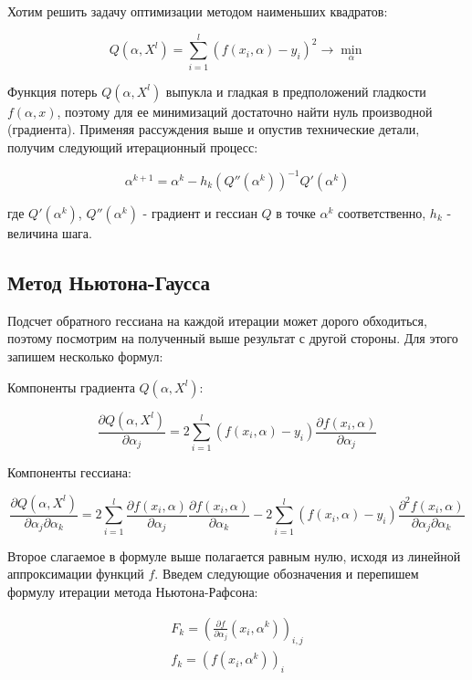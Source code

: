 {Хотим решить задачу оптимизации методом наименьших квадратов:

\[
Q(\alpha, X^{l}) = \sum\limits_{i = 1}^{l}\left(f(x_{i}, \alpha) - y_{i} \right)^{2} \to \min_{\alpha}
\]

Функция потерь \( Q(\alpha, X^{l}) \) выпукла и гладкая в предположений гладкости \( f(\alpha, x) \), поэтому для ее минимизаций достаточно найти нуль производной (градиента). Применяя рассуждения выше и опустив технические детали, получим следующий итерационный процесс:

\[
\alpha^{k + 1} = \alpha^{k} - h_{k}\left(Q''( \alpha^{k} )\right)^{-1} Q'(\alpha^{k})
\]

где \( Q'( \alpha^{k} ) \), \( Q''(\alpha^{k} ) \) - градиент и гессиан \( Q \) в точке \( \alpha^{k} \) соответственно, \( h_{k} \) - величина шага.
\subsection*{Метод Ньютона-Гаусса}

Подсчет обратного гессиана на каждой итерации может дорого обходиться, поэтому посмотрим на полученный выше результат с другой стороны. Для этого запишем несколько формул:

Компоненты градиента \( Q(\alpha, X^{l}) \):

\[
\frac{\partial Q(\alpha, X^{l})}{\partial\alpha_{j}} = 2 \sum\limits_{i = 1}^{l} \left(f(x_{i}, \alpha) - y_{i} \right)\frac{\partial f(x_{i}, \alpha)}{\partial\alpha_{j}}
\]

Компоненты гессиана:

\[
\frac{\partial Q(\alpha, X^{l})}{\partial\alpha_{j}\partial\alpha_{k}} = 2\sum\limits_{i = 1}^{l}\frac{\partial f(x_{i}, \alpha)}{\partial\alpha_{j}}\frac{\partial f(x_{i}, \alpha)}{\partial\alpha_{k}} - 2\sum\limits_{i = 1}^{l}\left(f(x_{i}, \alpha) - y_{i}\right)\frac{\partial^2 f(x_{i}, \alpha)}{\partial\alpha_{j}\partial\alpha_{k}}
\]

Второе слагаемое в формуле выше полагается равным нулю, исходя из линейной аппроксимации функций \( f \). Введем следующие обозначения и перепишем формулу итерации метода Ньютона-Рафсона:

\begin{gather*}
    F_{k} = \left( \frac{\partial f}{\partial\alpha_{j}}(x_{i}, \alpha^{k}) \right)_{i, j}\\[1em]
    f_{k} = \left( f(x_{i}, \alpha^{k}) \right)_{i}
\end{gather*}

}
